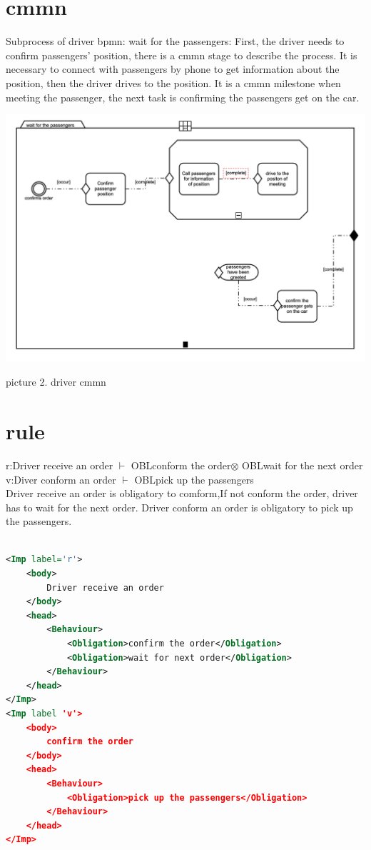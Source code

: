 \documentclass[runningheads]{llncs}
\begin{document}
\section{cmmn}
\noindent Subprocess of driver bpmn: wait for the passengers:
First, the driver needs to confirm passengers’ position, there is a cmmn stage to describe the process. It is necessary to connect with passengers by phone to get information about the position, then the driver drives to the position. It is a cmmn milestone when meeting the passenger, the next task is confirming the passengers get on the car.
\centerline{\includegraphics[scale=0.5]{driver_cmmn_128.png}}
\centerline{picture 2. driver cmmn}


\section{rule}
r:Driver receive an order $\vdash$ OBLconform the order$\otimes$ OBLwait for the next order\\
v:Diver conform an order $\vdash$ OBLpick up the passengers\\

Driver receive an order is obligatory to comform,If not conform the order, driver has to wait for the next order.
Driver conform an order is obligatory to pick up the passengers. 

\begin{lstlisting}[language={xml}]	%代码段语句

<Imp label='r'>
	<body>
		Driver receive an order
	</body>
	<head>
		<Behaviour>
			<Obligation>confirm the order</Obligation>
			<Obligation>wait for next order</Obligation>
		</Behaviour>
	</head>
</Imp>
<Imp label 'v'>
	<body>
		confirm the order
	</body>
	<head>
		<Behaviour>
			<Obligation>pick up the passengers</Obligation>
		</Behaviour>
	</head>
</Imp>




\end{lstlisting}
\end{document}
